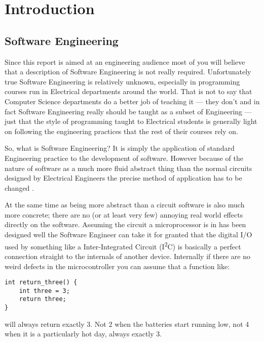 \section{Introduction}

  \subsection{Software Engineering}

    Since this report is aimed at an engineering audience most of you will
    believe that a description of Software Engineering is not really required.
    Unfortunately true Software Engineering is relatively unknown, especially in
    programming courses run in Electrical departments around the world.  That is
    not to say that Computer Science departments do a better job of teaching it
    --- they don't \cite{Shepard:2001:MTT:376134.376180} and in fact Software
    Engineering really should be taught as a subset of Engineering
    \cite{Parnas_1999} --- just that the style of programming taught to
    Electrical students is generally light on following the engineering
    practices that the rest of their courses rely on.

    So, what is Software Engineering?  It is simply the application of standard
    Engineering practice to the development of software.  However because of the
    nature of software as a much more fluid abstract thing than the normal
    circuits designed by Electrical Engineers the precise method of application
    has to be changed \cite{vanVliet:2000:SEP:352372}.

    At the same time as being more abstract than a circuit software is also much
    more concrete; there are no (or at least very few) annoying real world
    effects directly on the software.  Assuming the circuit a microprocessor is
    in has been designed well the Software Engineer can take it for granted that
    the digital I/O used by something like a Inter-Integrated Circuit
    (I\textsuperscript{2}C) is basically a perfect connection straight to the
    internals of another device.  Internally if there are no weird defects in
    the microcontroller you can assume that a function like:

\begin{lstlisting}
int return_three() {
    int three = 3;
    return three;
}
\end{lstlisting}

    will always return exactly 3.  Not 2 when the batteries start running low,
    not 4 when it is a particularly hot day, always exactly 3.

